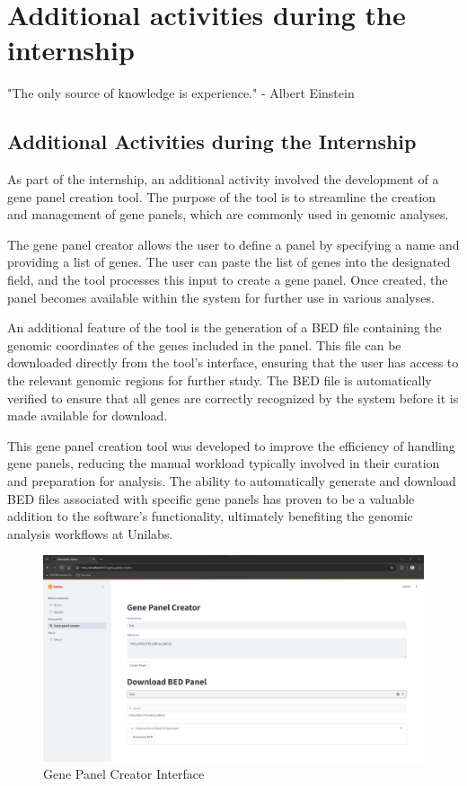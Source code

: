 \chapter{Additional activities during the internship}
\label{chapter:Additional activities during the internship}

\begin{introduction}
    "The only source of knowledge is experience." - Albert Einstein
\end{introduction}


\section{Additional Activities during the Internship}

As part of the internship, an additional activity involved the development of a gene panel creation tool. The purpose of the tool is to streamline the creation and management of gene panels, which are commonly used in genomic analyses.

The gene panel creator allows the user to define a panel by specifying a name and providing a list of genes. The user can paste the list of genes into the designated field, and the tool processes this input to create a gene panel. Once created, the panel becomes available within the system for further use in various analyses.

An additional feature of the tool is the generation of a BED file containing the genomic coordinates of the genes included in the panel. This file can be downloaded directly from the tool's interface, ensuring that the user has access to the relevant genomic regions for further study. The BED file is automatically verified to ensure that all genes are correctly recognized by the system before it is made available for download.

This gene panel creation tool was developed to improve the efficiency of handling gene panels, reducing the manual workload typically involved in their curation and preparation for analysis. The ability to automatically generate and download BED files associated with specific gene panels has proven to be a valuable addition to the software's functionality, ultimately benefiting the genomic analysis workflows at Unilabs.

\begin{figure}[H]
    \centering
    \includegraphics[width=\textwidth]{figs/v3.13.png}
    \caption{Gene Panel Creator Interface}
    \label{fig:gene_panel_creator}
\end{figure}
